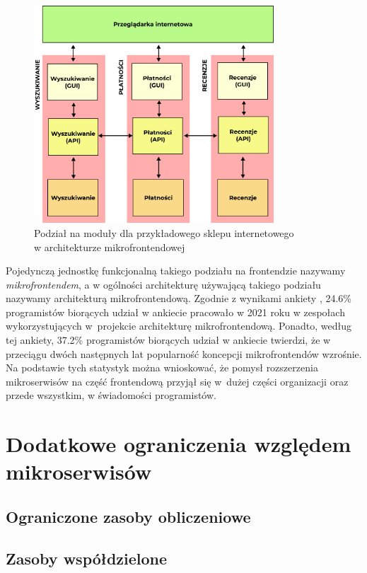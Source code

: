 \documentclass{SGGW-thesis}
\begin{document}
  \begin{figure}[h]
    \centering
    \captionsetup{justification=centering}
    \includegraphics[width=0.8\textwidth]{microfrontends_diagram.png}
    \caption{Podział na moduły dla przykładowego sklepu internetowego \\ w architekturze mikrofrontendowej}
    \label{fig:microfrontends_diagram}
  \end{figure}
  
  Pojedynczą jednostkę funkcjonalną takiego podziału na frontendzie nazywamy \textit{mikrofrontendem}, a w ogólności architekturę używającą takiego podziału nazywamy architekturą mikrofrontendową.
  Zgodnie z wynikami ankiety \cite{tsh_2022}, 24.6\% programistów biorących udział w ankiecie pracowało w 2021 roku w zespołach wykorzystujących w~projekcie architekturę mikrofrontendową. Ponadto, według tej ankiety, 37.2\% programistów biorących udział w ankiecie twierdzi, że w przeciągu dwóch następnych lat popularność koncepcji mikrofrontendów wzrośnie. Na podstawie tych statystyk można wnioskować, że pomysł rozszerzenia mikroserwisów na część frontendową przyjął się w~dużej części organizacji oraz przede wszystkim, w świadomości programistów.

  \section{Dodatkowe ograniczenia względem mikroserwisów}
    \subsection{Ograniczone zasoby obliczeniowe}
    \subsection{Zasoby współdzielone}
\end{document}
